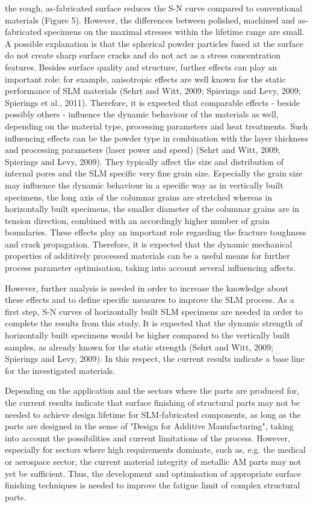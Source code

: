 \documentclass[10pt]{article}
\begin{document}
the rough, as-fabricated surface reduces the S-N curve compared to conventional materials (Figure 5). However, the differences between polished, machined and as-fabricated specimens on the maximal stresses within the lifetime range are small. A possible explanation is that the spherical powder particles fused at the surface do not create sharp surface cracks and do not act as a stress concentration features. Besides surface quality and structure, further effects can play an important role: for example, anisotropic effects are well known for the static performance of SLM materials (Sehrt and Witt, 2009; Spierings and Levy, 2009; Spierings et al., 2011). Therefore, it is expected that comparable effects - beside possibly others - influence the dynamic behaviour of the materials as well, depending on the material type, processing parameters and heat treatments. Such influencing effects can be the powder type in combination with the layer thickness and processing parameters (laser power and speed) (Sehrt and Witt, 2009; Spierings and Levy, 2009). They typically affect the size and distribution of internal pores and the SLM specific very fine grain size. Especially the grain size may influence the dynamic behaviour in a specific way as in vertically built specimens, the long axis of the columnar grains are stretched whereas in horizontally built specimens, the smaller diameter of the columnar grains are in tension direction, combined with an accordingly higher number of grain boundaries. These effects play an important role regarding the fracture toughness and crack propagation. Therefore, it is expected that the dynamic mechanical properties of additively processed materials can be a useful means for further process parameter optimisation, taking into account several influencing affects.

However, further analysis is needed in order to increase the knowledge about these effects and to define specific measures to improve the SLM process. As a first step, S-N curves of horizontally built SLM specimens are needed in order to complete the results from this study. It is expected that the dynamic strength of horizontally built specimens would be higher compared to the vertically built samples, as already known for the static strength (Sehrt and Witt, 2009; Spierings and Levy, 2009). In this respect, the current results indicate a base line for the investigated materials.

Depending on the application and the sectors where the parts are produced for, the current results indicate that surface finishing of structural parts may not be needed to achieve design lifetime for SLM-fabricated components, as long as the parts are designed in the sense of "Design for Additive Manufacturing", taking into account the possibilities and current limitations of the process. However, especially for sectors where high requirements dominate, such as, e.g. the medical or aerospace sector, the current material integrity of metallic AM parts may not yet be sufficient. Thus, the development and optimisation of appropriate surface finishing techniques is needed to improve the fatigue limit of complex structural parts.
\end{document}
